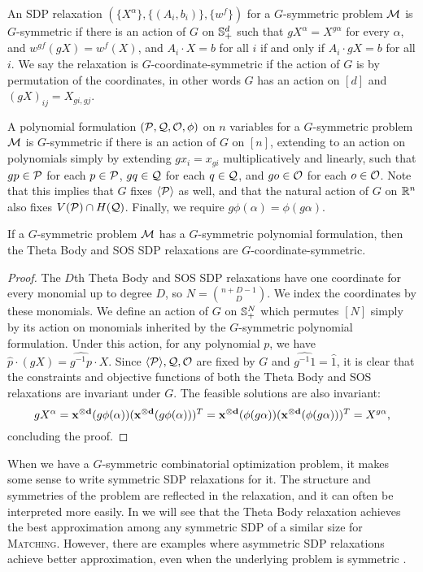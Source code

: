 \begin{definition}
An SDP relaxation $(\{X^\alpha\},\{(A_i,b_i)\},\{w^f\})$ for a $G$-symmetric problem $\mathcal M$ is $G$-symmetric if there is an action of $G$ on $\mathbb{S}^{d}_+$ such that $gX^\alpha = X^{g\alpha}$ for every $\alpha$, and $w^{gf}(gX) = w^f(X)$, and $A_i \cdot X = b$ for all $i$ if and only if $A_i \cdot gX = b$ for all $i$. We say the relaxation is $G$-coordinate-symmetric if the action of $G$ is by permutation of the coordinates, in other words $G$ has an action on $[d]$ and $(gX)_{ij} = X_{gi,gj}$.
\end{definition}

\begin{definition}
A polynomial formulation $(\mathcal P,\mathcal Q,\mathcal O,\phi)$ on $n$ variables for a $G$-symmetric problem $\mathcal M$ is $G$-symmetric if there is an action of $G$ on $[n]$, extending to an action on polynomials simply by extending $gx_i = x_{gi}$ multiplicatively and linearly, such that $gp \in \mathcal P$ for each $p \in \mathcal P$, $gq \in \mathcal Q$ for each $q \in \mathcal Q$, and $go \in \mathcal O$ for each $o \in \mathcal O$. Note that this implies that $G$ fixes $\langle \mathcal P \rangle$ as well, and that the natural action of $G$ on $\mathbb R^n$ also fixes $V(\mathcal P) \cap H(\mathcal Q)$. Finally, we require $g\phi(\alpha) = \phi(g\alpha)$.
\end{definition}

\begin{lemma}
If a $G$-symmetric problem $\mathcal M$ has a $G$-symmetric polynomial formulation, then the Theta Body and SOS SDP relaxations are $G$-coordinate-symmetric.
\end{lemma}
\begin{proof}
The $D$th Theta Body and SOS SDP relaxations have one coordinate for every monomial up to degree $D$, so $N = \binom{n+D-1}{D}$. We index the coordinates by these monomials. We define an action of $G$ on $\mathbb{S}^{N}_+$ which permutes $[N]$ simply by its action on monomials inherited by the $G$-symmetric polynomial formulation. Under this action, for any polynomial $p$, we have $\hat{p}\cdot (gX) = \widehat{g^{-1}p} \cdot X$. Since $\langle \mathcal P \rangle,\mathcal Q,\mathcal O$ are fixed by $G$ and $\widehat{g^{-1}1} = \hat{1}$, it is clear that the constraints and objective functions of both the Theta Body and SOS relaxations are invariant under $G$. The feasible solutions are also invariant:
\[gX^\alpha = \mathbf{x^{\otimes d}}(g\phi(\alpha))(\mathbf{x^{\otimes d}}(g\phi(\alpha)))^T = \mathbf{x^{\otimes d}}(\phi(g\alpha))(\mathbf{x^{\otimes d}}(\phi(g\alpha)))^T = X^{g\alpha},\]
concluding the proof.
\end{proof}

When we have a $G$-symmetric combinatorial optimization problem, it makes some sense to write symmetric SDP relaxations for it.
The structure and symmetries of the problem are reflected in the relaxation, and it can often be interpreted more easily.
In  we will see that the Theta Body relaxation achieves the best approximation among any symmetric SDP of a similar size for \textsc{Matching}.
However, there are examples where asymmetric SDP relaxations achieve better approximation, even when the underlying problem is symmetric \cite{KPT10}.
